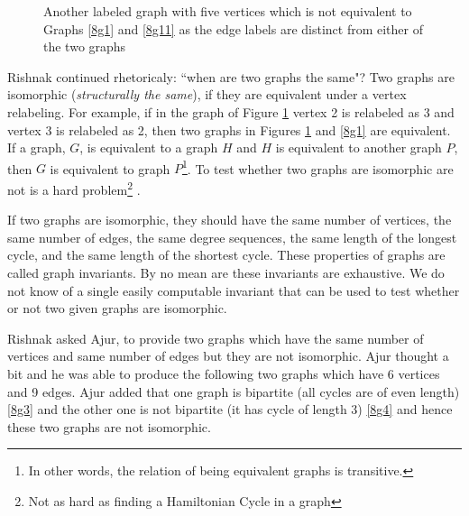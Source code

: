 \begin{figure}
\begin{center}
\caption{ Another labeled graph with five vertices which is not equivalent to Graphs \ref{8g1} and \ref{8g11} as the edge labels are distinct from either of the two graphs}\label{8g2}
\end{center}
\end{figure}

Rishnak continued rhetoricaly: ``when are two graphs the same"? Two graphs are isomorphic (\emph{structurally the same}), if they are equivalent under a vertex relabeling. For example, if in the graph of Figure \ref{8g2} vertex 2 is relabeled as 3 and vertex 3 is relabeled as 2, then two graphs in Figures \ref{8g2} and \ref{8g1} are equivalent. If a graph, $G$, is equivalent to a graph $H$ and $H$ is equivalent to another graph $P$, then $G$ is equivalent to graph $P$\footnote{In other words, the relation of being equivalent graphs is transitive.}. To test whether two graphs are isomorphic are not is a hard problem\footnote{Not as hard as finding a Hamiltonian Cycle in a graph} .

If two graphs are isomorphic, they should have the same number of vertices, the same number of edges, the same degree sequences, the same length of the longest cycle, and the same length of the shortest cycle.  These properties of graphs are called graph invariants. By no mean are these invariants are exhaustive. We do not know of a single easily computable invariant that can be used to test whether or not two given graphs are isomorphic. 

Rishnak asked Ajur, to provide two graphs which have the same number of vertices and same number of edges but they are not isomorphic. Ajur thought a bit and he was able to produce the following two graphs which have 6 vertices and 9 edges. Ajur added that one graph is bipartite (all cycles are of even length) \ref{8g3} and the other one is not bipartite (it has cycle of length 3) \ref{8g4} and hence these two graphs are not isomorphic.


